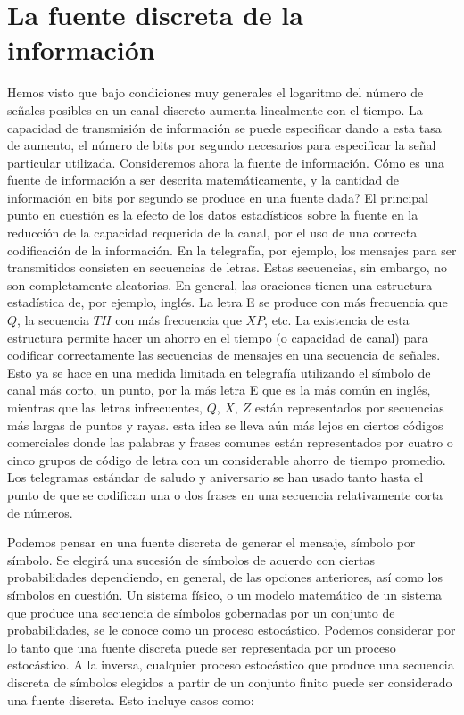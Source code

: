 \clearpage

\section{La fuente discreta de la informaci\'on}

Hemos visto que bajo condiciones muy generales el logaritmo del
n\'umero de se\~nales posibles en un canal discreto aumenta
linealmente con el tiempo. La capacidad de transmisi\'on de
informaci\'on se puede especificar dando a esta tasa de aumento, el
n\'umero de bits por segundo necesarios para especificar la se\~nal
particular utilizada.  Consideremos ahora la fuente de
informaci\'on. {\textquestiondown}C\'omo es una fuente de
informaci\'on a ser descrita matem\'aticamente, y la cantidad de
informaci\'on en bits por segundo se produce en una fuente dada? El
principal punto en cuesti\'on es la efecto de los datos estad\'isticos
sobre la fuente en la reducci\'on de la capacidad requerida de la
canal, por el uso de una correcta codificaci\'on de la
informaci\'on. En la telegraf\'ia, por ejemplo, los mensajes para ser
transmitidos consisten en secuencias de letras. Estas secuencias, sin
embargo, no son completamente aleatorias. En general, las oraciones
tienen una estructura estad\'istica de, por ejemplo, ingl\'es. La
letra E se produce con m\'as frecuencia que $Q$, la secuencia $TH$ con
m\'as frecuencia que $XP$, etc. La existencia de esta estructura
permite hacer un ahorro en el tiempo (o capacidad de canal) para
codificar correctamente las secuencias de mensajes en una secuencia de
se\~nales. Esto ya se hace en una medida limitada en telegraf\'ia
utilizando el s\'imbolo de canal m\'as corto, un punto, por la m\'as
letra E que es la m\'as com\'un en ingl\'es, mientras que las letras
infrecuentes, $Q$, $X$, $Z$ est\'an representados por secuencias m\'as
largas de puntos y rayas. esta idea se lleva a\'un m\'as lejos en
ciertos c\'odigos comerciales donde las palabras y frases comunes
est\'an representados por cuatro o cinco grupos de c\'odigo de letra
con un considerable ahorro de tiempo promedio.  Los telegramas
est\'andar de saludo y aniversario se han usado tanto hasta el punto
de que se codifican una o dos frases en una secuencia relativamente
corta de n\'umeros.

Podemos pensar en una fuente discreta de generar el mensaje, s\'imbolo
por s\'imbolo. Se elegir\'a una sucesi\'on de s\'imbolos de acuerdo
con ciertas probabilidades dependiendo, en general, de las opciones
anteriores, as\'i como los s\'imbolos en cuesti\'on. Un sistema
f\'isico, o un modelo matem\'atico de un sistema que produce una
secuencia de s\'imbolos gobernadas por un conjunto de probabilidades,
se le conoce como un proceso estoc\'astico.  Podemos considerar por lo
tanto que una fuente discreta puede ser representada por un proceso
estoc\'astico. A la inversa, cualquier proceso estoc\'astico que
produce una secuencia discreta de s\'imbolos elegidos a partir de un
conjunto finito puede ser considerado una fuente discreta. Esto
incluye casos como:

